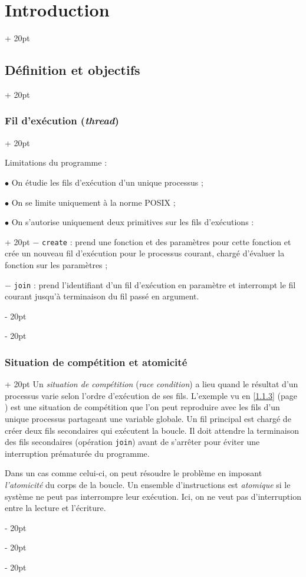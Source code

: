 \documentclass[a4paper, 12pt, twoside]{article}
\newcommand{\ind}[1][20pt]{\advance\leftskip + #1}
\newcommand{\deind}[1][20pt]{\advance\leftskip - #1}
\newenvironment{indt}[2][20pt]{#2 \par \ind[#1]}{\par \deind} %
\begin{document}
\begin{indt}{\section{Introduction}}
\begin{indt}{\subsection{Définition et objectifs}}
\begin{indt}{\subsubsection{Fil d'exécution (\textit{thread})}}
                \vspace{12pt}
                
                Limitations du programme :

                $\bullet$ On étudie les fils d'exécution d'un unique processus ;

                $\bullet$ On se limite uniquement à la norme POSIX ;

                \begin{indt}{$\bullet$ On s'autorise uniquement deux primitives sur les fils d'exécutions :}
                    $-$ \texttt{create} : prend une fonction et des paramètres pour cette fonction et crée un nouveau fil d'exécution pour le processus courant, chargé d'évaluer la fonction sur les paramètres ;

                    $-$ \texttt{join} : prend l'identifiant d'un fil d'exécution en paramètre et interrompt le fil courant jusqu'à terminaison du fil passé en argument.
                \end{indt}
            \end{indt}

            \vspace{12pt}
            
            \begin{indt}{\subsubsection{Situation de compétition et atomicité}}
                Un \textit{situation de compétition} (\textit{race condition}) a lieu quand le résultat d'un processus varie selon l'ordre d'exécution de ses fils. L'exemple vu en \ref{1.1.3} (page \pageref{1.1.3}) est une situation de compétition que l'on peut reproduire avec les fils d'un unique processus partageant une variable globale.
                Un fil principal est chargé de créer deux fils secondaires qui exécutent la boucle.
                Il doit attendre la terminaison des fils secondaires (opération \texttt{join}) avant de s'arrêter pour éviter une interruption prématurée du programme.

                Dans un cas comme celui-ci, on peut résoudre le problème en imposant \textit{l'atomicité} du corps de la boucle. Un ensemble d'instructions est \textit{atomique} si le système ne peut pas interrompre leur exécution. Ici, on ne veut pas d'interruption entre la lecture et l'écriture.
            \end{indt}


\end{indt}
\end{indt}
\end{document}
